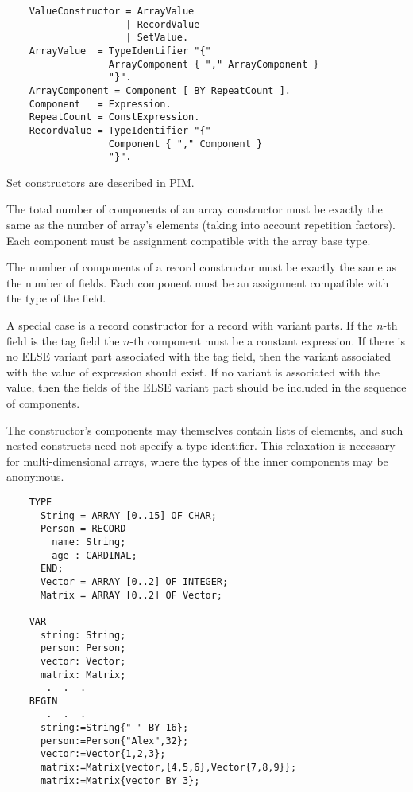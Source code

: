 \begin{verbatim}
    ValueConstructor = ArrayValue
                     | RecordValue
                     | SetValue.
    ArrayValue  = TypeIdentifier "{"
                  ArrayComponent { "," ArrayComponent }
                  "}".
    ArrayComponent = Component [ BY RepeatCount ].
    Component   = Expression.
    RepeatCount = ConstExpression.
    RecordValue = TypeIdentifier "{"
                  Component { "," Component }
                  "}".
\end{verbatim}

Set constructors are described in PIM.

The total number of components of an array constructor must
be exactly the same as the number of array's elements (taking into
account repetition factors). Each component must be
assignment compatible with the array base type.

The number of components of a record constructor must be exactly
the same as the number of fields. Each component must be an assignment
compatible with the type of the field.

A special case is a record constructor for a record with variant
parts. If the $n$-th field is the tag field the $n$-th component
must be a constant expression. If there is no ELSE variant part
associated with the tag field, then the variant associated with the
value of expression should exist. If no variant is associated with
the value, then the fields of the ELSE variant part should be
included in the sequence of components.

The constructor's components may themselves contain lists of
elements, and such nested constructs need not specify a type
identifier. This relaxation is necessary for multi-dimensional
arrays, where the types of the inner components may be anonymous.

\Examples
\begin{verbatim}
    TYPE
      String = ARRAY [0..15] OF CHAR;
      Person = RECORD
        name: String;
        age : CARDINAL;
      END;
      Vector = ARRAY [0..2] OF INTEGER;
      Matrix = ARRAY [0..2] OF Vector;

    VAR
      string: String;
      person: Person;
      vector: Vector;
      matrix: Matrix;
       .  .  .
    BEGIN
       .  .  .
      string:=String{" " BY 16};
      person:=Person{"Alex",32};
      vector:=Vector{1,2,3};
      matrix:=Matrix{vector,{4,5,6},Vector{7,8,9}};
      matrix:=Matrix{vector BY 3};
\end{verbatim}

